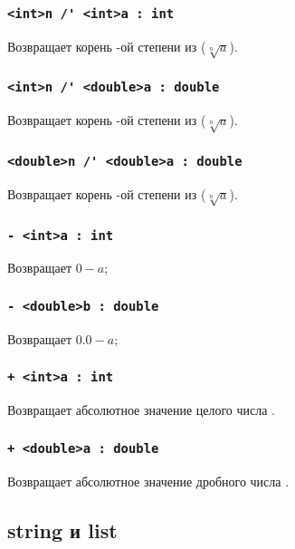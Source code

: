 \documentclass[a4paper, 14pt]{extarticle}
\begin{document}
\subsubsection{\lstinline`<int>n /' <int>a : int`}
Возвращает корень -ой степени из  ($\sqrt[n]{a}$).

\subsubsection{\lstinline`<int>n /' <double>a : double`}
Возвращает корень -ой степени из  ($\sqrt[n]{a}$).

\subsubsection{\lstinline`<double>n /' <double>a : double`}
Возвращает корень -ой степени из  ($\sqrt[n]{a}$).


\subsubsection{\lstinline`- <int>a : int`}
Возвращает $0-a$;

\subsubsection{\lstinline`- <double>b : double`}
Возвращает $0.0-a$;

\subsubsection{\lstinline`+ <int>a : int`}
Возвращает абсолютное значение целого числа .

\subsubsection{\lstinline`+ <double>a : double`}
Возвращает абсолютное значение дробного числа .

\subsection{{\color{bluemarin}string} и {\color{bluemarin}list}}
\end{document}
